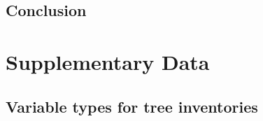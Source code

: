 \documentclass[12pt,twoside]{reedthesis}
\begin{document}
\hypertarget{conclusion}{%
\section{Conclusion}\label{conclusion}}

\appendix

\hypertarget{data}{%
\chapter{Supplementary Data}\label{data}}

\hypertarget{variable-types-for-tree-inventories}{%
\section*{Variable types for tree inventories}\label{variable-types-for-tree-inventories}}
\end{document}
